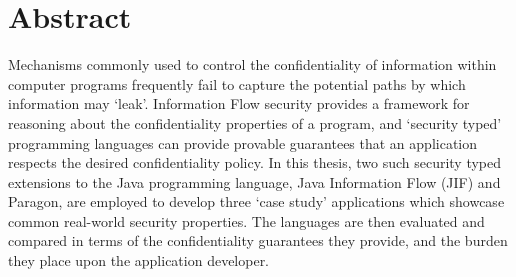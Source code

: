 \chapter{Abstract}

Mechanisms commonly used to control the confidentiality of information within computer programs frequently fail to capture the potential paths by which information may `leak'. Information Flow security provides a framework for reasoning about the confidentiality properties of a program, and `security typed' programming languages can provide provable guarantees that an application respects the desired confidentiality policy. In this thesis, two such security typed extensions to the Java programming language, Java Information Flow (JIF) and Paragon, are employed to develop three `case study' applications which showcase common real-world security properties. The languages are then evaluated and compared in terms of the confidentiality guarantees they provide, and the burden they place upon the application developer.